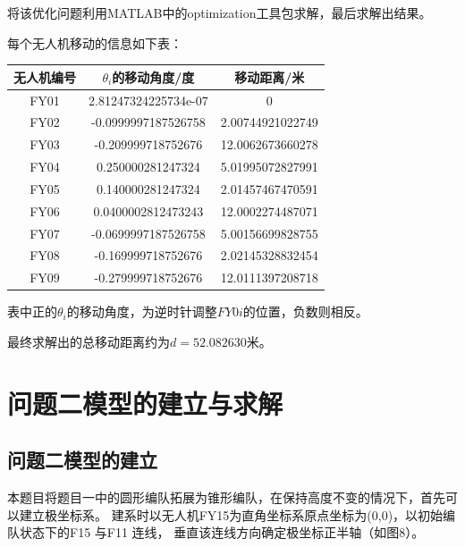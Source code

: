 \documentclass{ctexart}
\def\t{\theta}
\begin{document}
	将该优化问题利用MATLAB中的optimization工具包求解，最后求解出结果。

	每个无人机移动的信息如下表：


\begin{center}
	\begin{tabular}{|c|c|c|}
		\hline
		\mbox{无人机编号}&\mbox{$\t_i$的移动角度/度}&\mbox{移动距离/米}\\
		\hline
		FY01&2.81247324225734e-07&0\\
		\hline
		FY02&-0.0999997187526758&2.00744921022749\\
		\hline
		FY03&-0.209999718752676&12.0062673660278\\
		\hline
		FY04&0.250000281247324&5.01995072827991\\
		\hline
		FY05&0.140000281247324&2.01457467470591\\
		\hline
		FY06&0.0400002812473243&12.0002274487071\\
		\hline
		FY07&-0.0699997187526758&5.00156699828755\\
		\hline
		FY08&-0.169999718752676&2.02145328832454\\
		\hline
		FY09&-0.279999718752676&12.0111397208718\\
		\hline
	\end{tabular}
\end{center}
	表中正的$\t_i$的移动角度，为逆时针调整$FY0i$的位置，负数则相反。

\vspace{0.5em}
	最终求解出的总移动距离约为$d=52.082630$米。

\newpage
\section{问题二模型的建立与求解}
	\subsection{问题二模型的建立}
	本题目将题目一中的圆形编队拓展为锥形编队，在保持高度不变的情况下，首先可以建立极坐标系。
	建系时以无人机FY15为直角坐标系原点坐标为(0,0)，以初始编队状态下的F15 与F11 连线，
	垂直该连线方向确定极坐标正半轴（如图8）。
\end{document}
